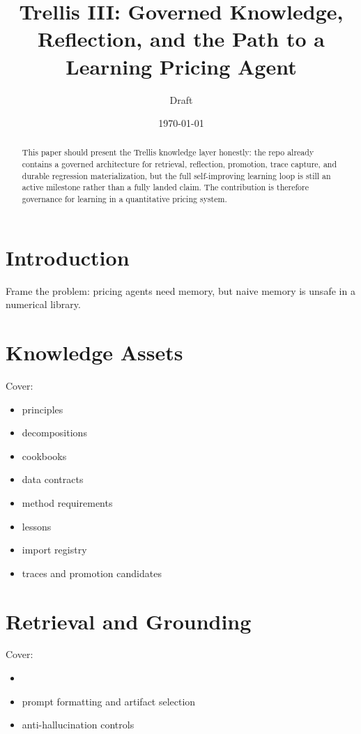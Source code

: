 \documentclass[11pt]{article}
\title{Trellis III: Governed Knowledge, Reflection, and the Path to a Learning Pricing Agent}
\author{Draft}
\date{\today}
\begin{document}
\maketitle

\begin{abstract}
This paper should present the Trellis knowledge layer honestly: the repo
already contains a governed architecture for retrieval, reflection, promotion,
trace capture, and durable regression materialization, but the full
self-improving learning loop is still an active milestone rather than a fully
landed claim. The contribution is therefore governance for learning in a
quantitative pricing system.
\end{abstract}

\tableofcontents

\section{Introduction}

Frame the problem: pricing agents need memory, but naive memory is unsafe in a
numerical library.

\section{Knowledge Assets}

Cover:
\begin{itemize}
    \item principles
    \item decompositions
    \item cookbooks
    \item data contracts
    \item method requirements
    \item lessons
    \item import registry
    \item traces and promotion candidates
\end{itemize}

\section{Retrieval and Grounding}

Cover:
\begin{itemize}
    \item {}
    \item prompt formatting and artifact selection
    \item anti-hallucination controls
\end{itemize}
\end{document}
